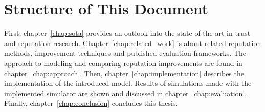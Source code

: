 \documentclass[%
    ]{\PathToTumTemplate/thesis/tum_thesis}
\begin{document}
\section{Structure of This Document}

First, chapter~\ref{chap:sota} provides an outlook into the state of the art in trust and reputation research.
Chapter~\ref{chap:related_work} is about related reputation methods, improvement techniques and published evaluation frameworks.
The approach to modeling and comparing reputation improvements are found in chapter~\ref{chap:approach}.
Then, chapter~\ref{chap:implementation} describes the implementation of the introduced model.
Results of simulations made with the implemented simulator are shown and discussed in chapter~\ref{chap:evaluation}.
Finally, chapter~\ref{chap:conclusion} concludes this thesis.















\end{document}
